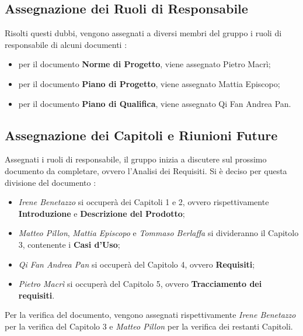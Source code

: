 \subsection{Assegnazione dei Ruoli di Responsabile}
	Risolti questi dubbi, vengono assegnati a diversi membri del gruppo i ruoli di responsabile di alcuni documenti : 
	\begin{itemize}
		\item per il documento \textbf{Norme di Progetto}, viene assegnato \textit{}Pietro Macrì;
		
		\item per il documento \textbf{Piano di Progetto}, viene assegnato \textit{}Mattia Episcopo;
		
		\item per il documento \textbf{Piano di Qualifica}, viene assegnato \textit{}Qi Fan Andrea Pan. 
		
	\end{itemize}

\subsection{Assegnazione dei Capitoli e Riunioni Future}
	Assegnati i ruoli di responsabile, il gruppo inizia a discutere sul prossimo documento da completare, ovvero l'Analisi dei Requisiti. Si è deciso per questa divisione del documento :
	\begin{itemize}
		\item \textit{Irene Benetazzo} si occuperà dei Capitoli 1 e 2, ovvero rispettivamente \textbf{Introduzione} e \textbf{Descrizione del Prodotto};
		\item \textit{Matteo Pillon}, \textit{Mattia Episcopo} e \textit{Tommaso Berlaffa} si divideranno il Capitolo 3, contenente i \textbf{Casi d'Uso};
		\item \textit{Qi Fan Andrea Pan} si occuperà del Capitolo 4, ovvero \textbf{Requisiti};
		\item \textit{Pietro Macrì} si occuperà del Capitolo 5, ovvero \textbf{Tracciamento dei requisiti}.
	\end{itemize}
	Per la verifica del documento, vengono assegnati rispettivamente \textit{Irene Benetazzo} per la verifica del Capitolo 3 e \textit{Matteo Pillon} per la verifica dei restanti Capitoli. \\

